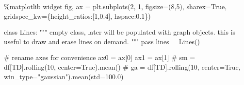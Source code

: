 \documentclass[
  letterpaper,
  DIV=11,
  numbers=noendperiod,
  oneside]{scrreprt}
\newenvironment{Shaded}{\begin{snugshade}}{\end{snugshade}}
\newcommand{\CommentTok}[1]{\textcolor[rgb]{0.37,0.37,0.37}{#1}}
\newcommand{\ControlFlowTok}[1]{\textcolor[rgb]{0.00,0.23,0.31}{#1}}
\newcommand{\DecValTok}[1]{\textcolor[rgb]{0.68,0.00,0.00}{#1}}
\newcommand{\FloatTok}[1]{\textcolor[rgb]{0.68,0.00,0.00}{#1}}
\newcommand{\KeywordTok}[1]{\textcolor[rgb]{0.00,0.23,0.31}{#1}}
\newcommand{\NormalTok}[1]{\textcolor[rgb]{0.00,0.23,0.31}{#1}}
\newcommand{\OperatorTok}[1]{\textcolor[rgb]{0.37,0.37,0.37}{#1}}
\newcommand{\StringTok}[1]{\textcolor[rgb]{0.13,0.47,0.30}{#1}}
\newcommand{\VariableTok}[1]{\textcolor[rgb]{0.07,0.07,0.07}{#1}}
\begin{document}
\begin{Shaded}
\begin{Highlighting}[]
\OperatorTok{\%}\NormalTok{matplotlib widget}
\NormalTok{fig, ax }\OperatorTok{=}\NormalTok{ plt.subplots(}\DecValTok{2}\NormalTok{, }\DecValTok{1}\NormalTok{, figsize}\OperatorTok{=}\NormalTok{(}\DecValTok{8}\NormalTok{,}\DecValTok{5}\NormalTok{), sharex}\OperatorTok{=}\VariableTok{True}\NormalTok{,}
\NormalTok{                       gridspec\_kw}\OperatorTok{=}\NormalTok{\{}\StringTok{\textquotesingle{}height\_ratios\textquotesingle{}}\NormalTok{:[}\DecValTok{1}\NormalTok{,}\FloatTok{0.4}\NormalTok{], }\StringTok{\textquotesingle{}hspace\textquotesingle{}}\NormalTok{:}\FloatTok{0.1}\NormalTok{\})}

\KeywordTok{class}\NormalTok{ Lines:}
    \CommentTok{"""}
\CommentTok{    empty class, later will be populated with graph objects.}
\CommentTok{    this is useful to draw and erase lines on demand.}
\CommentTok{    """}
    \ControlFlowTok{pass}
\NormalTok{lines }\OperatorTok{=}\NormalTok{ Lines()}

\CommentTok{\# rename axes for convenience}
\NormalTok{ax0 }\OperatorTok{=}\NormalTok{ ax[}\DecValTok{0}\NormalTok{]}
\NormalTok{ax1 }\OperatorTok{=}\NormalTok{ ax[}\DecValTok{1}\NormalTok{]}
\CommentTok{\# sm = df[\textquotesingle{}TD\textquotesingle{}].rolling(10, center=True).mean()}
\CommentTok{\# ga = df[\textquotesingle{}TD\textquotesingle{}].rolling(10, center=True, win\_type="gaussian").mean(std=100.0)}


\end{Highlighting}
\end{Shaded}
\end{document}
